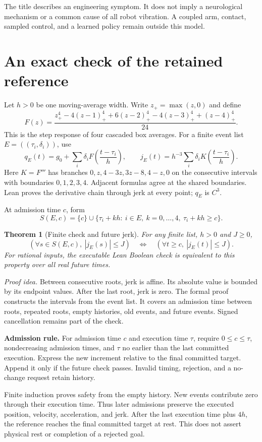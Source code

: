 \documentclass[11pt,letterpaper]{article}
\newtheorem{theorem}{Theorem}
\begin{document}
The title describes an engineering symptom. It does not imply a neurological mechanism or a common cause of all robot vibration. A coupled arm, contact, sampled control, and a learned policy remain outside this model.

\newpage
\section{An exact check of the retained reference}
Let $h>0$ be one moving-average width. Write $z_+=\max(z,0)$ and define
\[
F(z)=\frac{z_+^4-4(z-1)_+^4+6(z-2)_+^4-4(z-3)_+^4+(z-4)_+^4}{24}.
\]
This is the step response of four cascaded box averages. For a finite event list $E=((\tau_i,\delta_i))$, use
\[
q_E(t)=g_0+\sum_i\delta_i F\left(\frac{t-\tau_i}{h}\right),\qquad
j_E(t)=h^{-3}\sum_i\delta_i K\left(\frac{t-\tau_i}{h}\right).
\]
Here $K=F'''$ has branches $0,z,4-3z,3z-8,4-z,0$ on the consecutive intervals with boundaries $0,1,2,3,4$. Adjacent formulas agree at the shared boundaries. Lean proves the derivative chain through jerk at every point; $q_E$ is $C^3$.

At admission time $c$, form
\[
S(E,c)=\{c\}\cup\{\tau_i+kh:\ i\in E,\ k=0,\ldots,4,\ \tau_i+kh\geq c\}.
\]
\begin{theorem}[Finite check and future jerk]\label{guard}
For any finite list, $h>0$ and $J\geq0$,
\[
(\forall s\in S(E,c),\ |j_E(s)|\leq J)
\quad\Longleftrightarrow\quad
(\forall t\geq c,\ |j_E(t)|\leq J).
\]
For rational inputs, the executable Lean Boolean check is equivalent to this property over all real future times.
\end{theorem}
\textit{Proof idea.} Between consecutive roots, jerk is affine. Its absolute value is bounded by its endpoint values. After the last root, jerk is zero. The formal proof constructs the intervals from the event list. It covers an admission time between roots, repeated roots, empty histories, old events, and future events. Signed cancellation remains part of the check.

\textbf{Admission rule.} For admission time $c$ and execution time $\tau$, require $0\leq c\leq\tau$, nondecreasing admission times, and $\tau$ no earlier than the last committed execution. Express the new increment relative to the final committed target. Append it only if the future check passes. Invalid timing, rejection, and a no-change request retain history.

Finite induction proves safety from the empty history. New events contribute zero through their execution time. Thus later admissions preserve the executed position, velocity, acceleration, and jerk. After the last execution time plus $4h$, the reference reaches the final committed target at rest. This does not assert physical rest or completion of a rejected goal.
\end{document}
